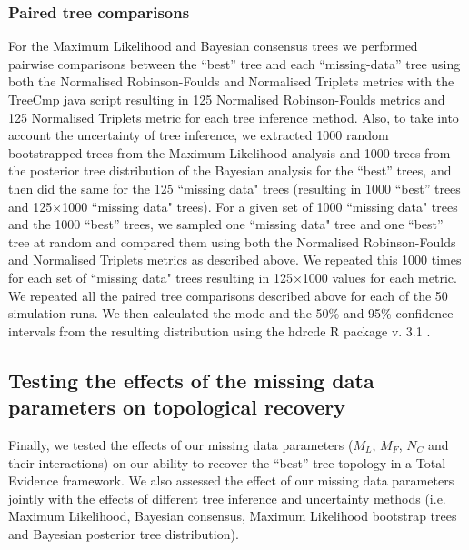 \documentclass[12pt,letterpaper]{article}
\begin{document}
\subsubsection{Paired tree comparisons}
\label{tree_comparisons}
For the Maximum Likelihood and Bayesian consensus trees we performed pairwise comparisons between the ``best'' tree and each ``missing-data'' tree using both the Normalised Robinson-Foulds and Normalised Triplets metrics with the TreeCmp java script \citep{Bogdanowicz2012} resulting in 125 Normalised Robinson-Foulds metrics and 125 Normalised Triplets metric for each tree inference method.
Also, to take into account the uncertainty of tree inference, we extracted 1000 random bootstrapped trees from the Maximum Likelihood analysis and 1000 trees from the posterior tree distribution of the Bayesian analysis for the ``best'' trees, and then did the same for the 125 ``missing data" trees (resulting in 1000 ``best'' trees and 125$\times$1000 ``missing data" trees). 
For a given set of 1000 ``missing data" trees and the 1000 ``best'' trees, we sampled one ``missing data" tree and one ``best'' tree at random and compared them using both the Normalised Robinson-Foulds and Normalised Triplets metrics as described above.
We repeated this 1000 times for each set of ``missing data" trees resulting in 125$\times$1000 values for each metric.
We repeated all the paired tree comparisons described above for each of the 50 simulation runs.
We then calculated the mode and the 50\% and 95\% confidence intervals from the resulting distribution using the hdrcde R package v. 3.1 \citep{hdrcde}.

\subsection{Testing the effects of the missing data parameters on topological recovery}
Finally, we tested the effects of our missing data parameters ($M_{L}$, $M_{F}$, $N_{C}$ and their interactions) on our ability to recover the ``best'' tree topology in a Total Evidence framework.
We also assessed the effect of our missing data parameters jointly with the effects of different tree inference and uncertainty methods (i.e. Maximum Likelihood, Bayesian consensus, Maximum Likelihood bootstrap trees and Bayesian posterior tree distribution).
\end{document}
